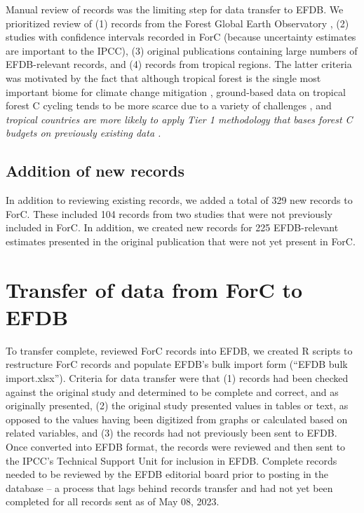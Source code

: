\documentclass[, manuscript]{copernicus}
\begin{document}
Manual review of records was the limiting step for data transfer to
EFDB. We prioritized review of (1) records from the Forest Global Earth
Observatory
\citep[ForestGEO,][]{anderson-teixeira_ctfsforestgeo_2015, davies_forestgeo_2021},
(2) studies with confidence intervals recorded in ForC (because
uncertainty estimates are important to the IPCC), (3) original
publications containing large numbers of EFDB-relevant records, and (4)
records from tropical regions. The latter criteria was motivated by the
fact that although tropical forest is the single most important biome
for climate change mitigation \citep{refs}, ground-based data on
tropical forest C cycling tends to be more scarce due to a variety of
challenges \citep{refs, delima_making_2022}, and \emph{tropical
countries are more likely to apply Tier 1 methodology that bases forest
C budgets on previously existing data \citep{ref}.}

\subsection{Addition of new records}

In addition to reviewing existing records, we added a total of 329 new
records to ForC. These included 104 records from two studies
\citep{piponiot_distribution_2022, lutz_largediameter_2021} that were
not previously included in ForC. In addition, we created new records for
225 EFDB-relevant estimates presented in the original publication that
were not yet present in ForC.

\section{Transfer of data from ForC to EFDB}

To transfer complete, reviewed ForC records into EFDB, we created R
scripts to restructure ForC records and populate EFDB's bulk import form
(``EFDB bulk import.xlsx''). Criteria for data transfer were that (1)
records had been checked against the original study and determined to be
complete and correct, and as originally presented, (2) the original
study presented values in tables or text, as opposed to the values
having been digitized from graphs or calculated based on related
variables, and (3) the records had not previously been sent to EFDB.
Once converted into EFDB format, the records were reviewed and then sent
to the IPCC's Technical Support Unit for inclusion in EFDB. Complete
records needed to be reviewed by the EFDB editorial board prior to
posting in the database -- a process that lags behind records transfer
and had not yet been completed for all records sent as of May 08, 2023.
\end{document}
